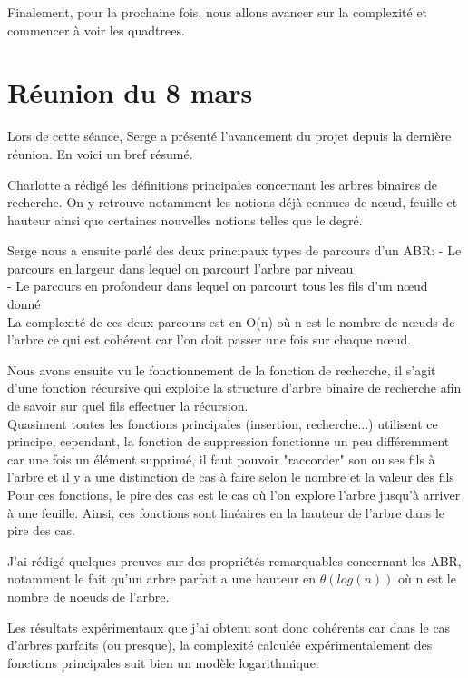 \documentclass{report}
\begin{document}
Finalement, pour la prochaine fois, nous allons avancer sur la complexité et commencer à voir les quadtrees.\\

\newpage
\section{Réunion du 8 mars}
Lors de cette séance, Serge a présenté l'avancement du projet depuis la dernière réunion. En voici un bref résumé.\newline

Charlotte a rédigé les définitions principales concernant les arbres binaires de recherche. On y retrouve notamment les notions déjà connues de nœud, feuille et hauteur ainsi que certaines nouvelles notions telles que le degré.

Serge nous a ensuite parlé des deux principaux types de parcours d'un ABR:
- Le parcours en largeur dans lequel on parcourt l'arbre par niveau \\
- Le parcours en profondeur dans lequel on parcourt tous les fils d'un nœud donné\\

La complexité de ces deux parcours est en O(n) où n est le nombre de nœuds de l'arbre ce qui est cohérent car l'on doit passer une fois sur chaque nœud.

Nous avons ensuite vu le fonctionnement de la fonction de recherche, il s'agit d'une fonction récursive qui exploite la structure d'arbre binaire de recherche afin de savoir sur quel fils effectuer la récursion.\\

Quasiment toutes les fonctions principales (insertion, recherche...) utilisent ce principe, cependant, la fonction de suppression fonctionne un peu différemment car une fois un élément supprimé, il faut pouvoir "raccorder" son ou ses fils à l'arbre et il y a une distinction de cas à faire selon le nombre et la valeur des fils \\

Pour ces fonctions, le pire des cas est le cas où l'on explore l'arbre jusqu'à arriver à une feuille. Ainsi, ces fonctions sont linéaires en la hauteur de l'arbre dans le pire des cas.

J'ai rédigé quelques preuves sur des propriétés remarquables concernant les ABR, notamment le fait qu'un arbre parfait a une hauteur en $\theta (log(n))$ où n est le nombre de noeuds de l'arbre.

Les résultats expérimentaux que j'ai obtenu sont donc cohérents car dans le cas d'arbres parfaits (ou presque), la complexité calculée expérimentalement des fonctions principales suit bien un modèle logarithmique. \\
\end{document}
